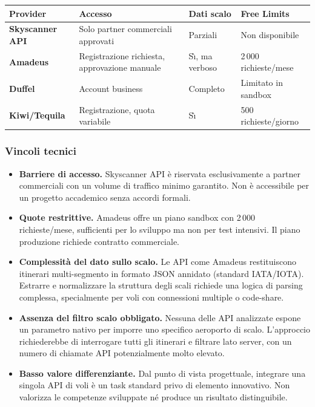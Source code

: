 \documentclass[a4paper, 11pt]{article}
\begin{document}
\begin{center}
\begin{tabularx}{\textwidth}{@{} >{\bfseries}p{2.4cm} X X X @{}}
\toprule
\rowcolor{light}
\textbf{Provider} & \textbf{Accesso} & \textbf{Dati scalo} & \textbf{Free Limits} \\
\midrule
Skyscanner API & Solo partner commerciali approvati & Parziali & Non disponibile \\[2pt]
Amadeus        & Registrazione richiesta, approvazione manuale & S\`{\i}, ma verboso & 2\,000 richieste/mese \\[2pt]
Duffel         & Account business & Completo & Limitato in sandbox \\[2pt]
Kiwi/Tequila   & Registrazione, quota variabile & S\`{\i} & 500 richieste/giorno \\
\bottomrule
\end{tabularx}
\end{center}

\subsubsection{Vincoli tecnici}

\begin{conbox}
\begin{itemize}
  \item \textbf{Barriere di accesso.} Skyscanner API \`e riservata esclusivamente a partner commerciali con un volume di traffico minimo garantito. Non \`e accessibile per un progetto accademico senza accordi formali.
  \item \textbf{Quote restrittive.} Amadeus offre un piano sandbox con 2\,000 richieste/mese, sufficienti per lo sviluppo ma non per test intensivi. Il piano produzione richiede contratto commerciale.
  \item \textbf{Complessit\`a del dato sullo scalo.} Le API come Amadeus restituiscono itinerari multi-segmento in formato JSON annidato (standard IATA/IOTA). Estrarre e normalizzare la struttura degli scali richiede una logica di parsing complessa, specialmente per voli con connessioni multiple o code-share.
  \item \textbf{Assenza del filtro scalo obbligato.} Nessuna delle API analizzate espone un parametro nativo per imporre uno specifico aeroporto di scalo. L'approccio richiederebbe di interrogare tutti gli itinerari e filtrare lato server, con un numero di chiamate API potenzialmente molto elevato.
  \item \textbf{Basso valore differenziante.} Dal punto di vista progettuale, integrare una singola API di voli \`e un task standard privo di elemento innovativo. Non valorizza le competenze sviluppate n\'e produce un risultato distinguibile.
\end{itemize}
\end{conbox}
\end{document}
